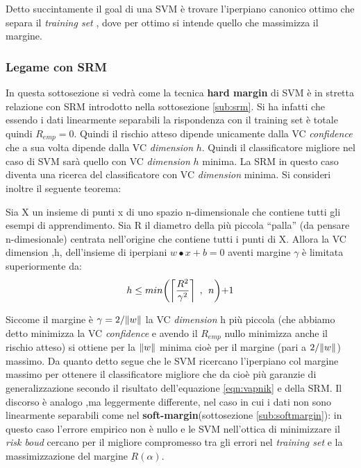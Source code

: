 Detto succintamente il goal di una \ac{SVM} è trovare l'iperpiano canonico ottimo che separa il \textit{training set} , dove per ottimo si intende quello che massimizza il margine.\\

\subsubsection{Legame con SRM}
\label{subsub:lsrm}
In questa sottosezione si vedrà come la tecnica \textbf{hard margin} di \ac{SVM} è in stretta relazione con \ac{SRM} introdotto nella sottosezione \ref{sub:srm}. Si ha infatti che essendo i dati linearmente separabili la rispondenza con il training set è totale quindi $R_{emp}=0$. Quindi il rischio atteso dipende unicamente dalla \ac{VC} \textit{confidence} che a sua volta dipende dalla \ac{VC} \textit{dimension} $h$. Quindi il classificatore migliore nel caso di \ac{SVM} sarà quello con \ac{VC} \textit{dimension} $h$ minima.  La \ac{SRM} in questo caso diventa una ricerca del classificatore con \ac{VC} \textit{dimension} minima. Si consideri inoltre il seguente teorema:
\begin{teorema}
\label{teo:suphdim}
Sia X un insieme di punti x di uno spazio n-dimensionale  che contiene tutti gli esempi di apprendimento. Sia R il diametro della più piccola ``palla'' (da pensare n-dimesionale) centrata nell'origine che contiene tutti i punti di X. Allora la \ac{VC} dimension ,h, dell'insieme di iperpiani $w \bullet x + b = 0$ aventi margine $\gamma$ è limitata superiormente da: 
\begin{equation*}
h \leq min \biggl( \ceil*{\frac{R^{2}}{\gamma^{2}}} \:\:,\:\: n \biggl) + 1
\end{equation*}
\end{teorema}
Siccome il margine è $\gamma = 2/\lVert w\rVert$ la \ac{VC} \textit{dimension} h più piccola (che abbiamo detto minimizza la \ac{VC} \textit{confidence} e avendo il $R_{emp}$ nullo minimizza anche il rischio atteso) si ottiene per la $\lVert w\rVert$ minima cioè per il margine (pari a $2/\lVert w\rVert$) massimo.  Da quanto detto segue che le \ac{SVM} ricercano l'iperpiano col margine massimo per ottenere il classificatore migliore che da cioè più garanzie di generalizzazione secondo il risultato dell'equazione \eqref{eqn:vapnik} e della \ac{SRM}.
Il discorso è analogo ,ma leggermente differente, nel caso in cui i dati non sono linearmente separabili come nel \textbf{soft-margin}(sottosezione \ref{sub:softmargin}): in questo caso l'errore empirico non è nullo e le \ac{SVM}  nell'ottica di minimizzare il \textit{risk boud} cercano per il migliore compromesso tra gli errori nel \textit{training set} e la massimizzazione del margine  $R(\alpha)$.

